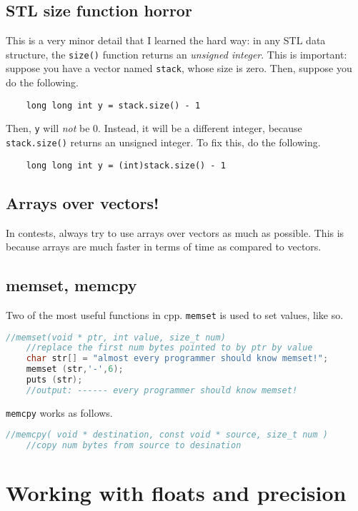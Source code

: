 \documentclass[12pt,a4paper]{amsart}
\numberwithin{equation}{section}
\theoremstyle{definition}
\begin{document}
\subsection{STL size function horror} This is a very minor detail that I learned the hard way: in any STL data structure, the \verb|size()| function returns an \textit{unsigned integer}. This is important: suppose you have a vector named \verb|stack|, whose size is zero. Then, suppose you do the following. 
\begin{verbatim}
    long long int y = stack.size() - 1
\end{verbatim}
Then, \verb|y| will \textit{not} be 0. Instead, it will be a different integer, because \verb|stack.size()| returns an unsigned integer. To fix this, do the following. 
\begin{verbatim}
    long long int y = (int)stack.size() - 1
\end{verbatim}

\subsection{Arrays over vectors!} In contests, always try to use arrays over vectors as much as possible. This is because arrays are much faster in terms of time as compared to vectors. 

\subsection{memset, memcpy} Two of the most useful functions in cpp. \verb|memset| is used to set values, like so. 
\begin{lstlisting}[language=C++]
    //memset(void * ptr, int value, size_t num)
    //replace the first num bytes pointed to by ptr by value 
    char str[] = "almost every programmer should know memset!";
    memset (str,'-',6);
    puts (str);
    //output: ------ every programmer should know memset!
\end{lstlisting}

\verb|memcpy| works as follows. 

\begin{lstlisting}[language=C++]
    //memcpy( void * destination, const void * source, size_t num )
    //copy num bytes from source to desination
\end{lstlisting}

\section{Working with floats and precision}
\end{document}

